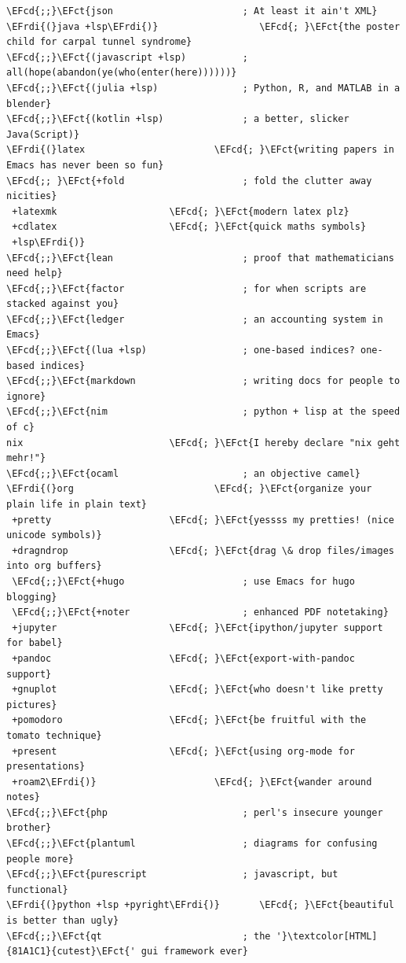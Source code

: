 \documentclass{scrartcl}
\newcommand{\EFct}[1]{\textcolor{EFct}{#1}} %
\newcommand{\EFcd}[1]{\textcolor{EFcd}{#1}} %
\newcommand{\EFrdi}[1]{#1} %
\begin{document}
\begin{enumerate}
\begin{Code}
\begin{Verbatim}[]
\EFcd{;;}\EFct{json                       ; At least it ain't XML}
\EFrdi{(}java +lsp\EFrdi{)}                  \EFcd{; }\EFct{the poster child for carpal tunnel syndrome}
\EFcd{;;}\EFct{(javascript +lsp)          ; all(hope(abandon(ye(who(enter(here))))))}
\EFcd{;;}\EFct{(julia +lsp)               ; Python, R, and MATLAB in a blender}
\EFcd{;;}\EFct{(kotlin +lsp)              ; a better, slicker Java(Script)}
\EFrdi{(}latex                       \EFcd{; }\EFct{writing papers in Emacs has never been so fun}
\EFcd{;; }\EFct{+fold                     ; fold the clutter away nicities}
 +latexmk                    \EFcd{; }\EFct{modern latex plz}
 +cdlatex                    \EFcd{; }\EFct{quick maths symbols}
 +lsp\EFrdi{)}
\EFcd{;;}\EFct{lean                       ; proof that mathematicians need help}
\EFcd{;;}\EFct{factor                     ; for when scripts are stacked against you}
\EFcd{;;}\EFct{ledger                     ; an accounting system in Emacs}
\EFcd{;;}\EFct{(lua +lsp)                 ; one-based indices? one-based indices}
\EFcd{;;}\EFct{markdown                   ; writing docs for people to ignore}
\EFcd{;;}\EFct{nim                        ; python + lisp at the speed of c}
nix                          \EFcd{; }\EFct{I hereby declare "nix geht mehr!"}
\EFcd{;;}\EFct{ocaml                      ; an objective camel}
\EFrdi{(}org                         \EFcd{; }\EFct{organize your plain life in plain text}
 +pretty                     \EFcd{; }\EFct{yessss my pretties! (nice unicode symbols)}
 +dragndrop                  \EFcd{; }\EFct{drag \& drop files/images into org buffers}
 \EFcd{;;}\EFct{+hugo                     ; use Emacs for hugo blogging}
 \EFcd{;;}\EFct{+noter                    ; enhanced PDF notetaking}
 +jupyter                    \EFcd{; }\EFct{ipython/jupyter support for babel}
 +pandoc                     \EFcd{; }\EFct{export-with-pandoc support}
 +gnuplot                    \EFcd{; }\EFct{who doesn't like pretty pictures}
 +pomodoro                   \EFcd{; }\EFct{be fruitful with the tomato technique}
 +present                    \EFcd{; }\EFct{using org-mode for presentations}
 +roam2\EFrdi{)}                     \EFcd{; }\EFct{wander around notes}
\EFcd{;;}\EFct{php                        ; perl's insecure younger brother}
\EFcd{;;}\EFct{plantuml                   ; diagrams for confusing people more}
\EFcd{;;}\EFct{purescript                 ; javascript, but functional}
\EFrdi{(}python +lsp +pyright\EFrdi{)}       \EFcd{; }\EFct{beautiful is better than ugly}
\EFcd{;;}\EFct{qt                         ; the '}\textcolor[HTML]{81A1C1}{cutest}\EFct{' gui framework ever}

\end{Verbatim}
\end{Code}
\end{enumerate}
\end{document}
